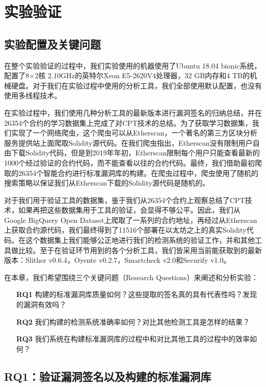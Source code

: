 \chapter{实验验证}

\section{实验配置及关键问题}

在整个实验验证的过程中，我们实验使用的机器使用了Ubuntu 18.04 bionic系统，配置了8$\times$2核 2.10GHz的英特尔Xeon E5-2620V4处理器，32 GB内存和4 TB的机械硬盘。对于我们在实验过程中使用的分析工具，我们全部使用默认配置，也没有使用多线程技术。

在实验过程中，我们使用几种分析工具的最新版本进行漏洞签名的归纳总结，并在26354个合约的学习数据集上完成了对CPT技术的总结。为了获取学习数据集，我们实现了一个网络爬虫，这个爬虫可以从Etherscan，一个著名的第三方区块分析服务提供站上面爬取Solidity源代码。在我们爬虫指出，Etherscan没有限制用户自由下载Solidity代码，但是到2019年年初，Etherscan限制每个用户只能查看最新的1000个经过验证的合约代码，而不能查看以往的合约代码。最终，我们借助最初爬取的26354个智能合约进行标准漏洞库的构建。在爬虫过程中，爬虫使用了随机的搜索策略以保证我们从Etherscan下载的Solidity源代码是随机的。

对于我们用于验证工具的数据集，鉴于我们从26354个合约上观察总结了CPT技术，如果再把这些数据集用于工具的验证，会显得不够公平。因此，我们从Google BigQuery Open Dataset上爬取了一系列的合约地址，再经过从Etherscan上获取合约源代码，我们最终得到了11516个部署在以太坊之上的真实Solidity代码。在这个数据集上我们能够公正地进行我们的检测系统的验证工作，并和其他工具做比较。至于在验证环节用到的各个分析工具，我们皆采用当前能获取到的最新版本：Slither v0.6.4，Oyente v0.2.7，Smartcheck v2.0和Securify v1.0。

在本章，我们希望围绕三个关键问题（Research Questions）来阐述和分析实验：
\begin{itemize}
  \item[\textbf{RQ1}] 构建的标准漏洞库质量如何？这些提取的签名真的具有代表性吗？发现的漏洞有效吗？
  \item[\textbf{RQ2}] 我们构建的检测系统准确率如何？对比其他检测工具是怎样的结果？
  \item[\textbf{RQ3}] 我们系统在构建标准漏洞库的过程中和对比其他工具的过程中的效率如何？
\end{itemize}

\section{RQ1：验证漏洞签名以及构建的标准漏洞库}

